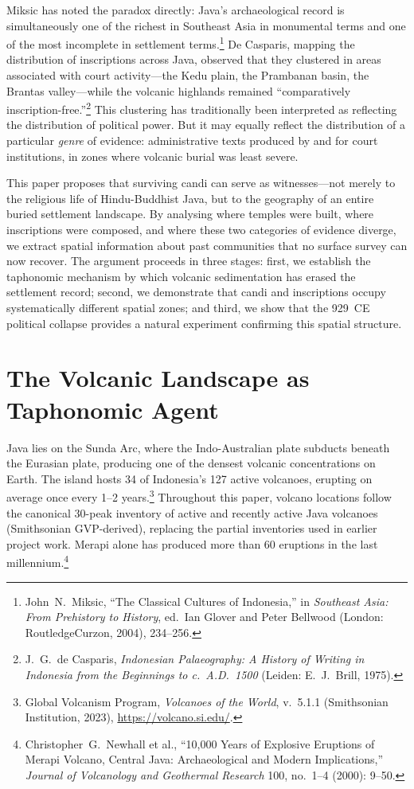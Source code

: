 \documentclass[12pt,a4paper]{article}
\begin{document}
Miksic has noted the paradox directly: Java's archaeological record is simultaneously one of the richest in Southeast Asia in monumental terms and one of the most incomplete in settlement terms.\footnote{John~N.\ Miksic, ``The Classical Cultures of Indonesia,'' in \emph{Southeast Asia: From Prehistory to History}, ed.\ Ian Glover and Peter Bellwood (London: RoutledgeCurzon, 2004), 234--256.}
De Casparis, mapping the distribution of inscriptions across Java, observed that they clustered in areas associated with court activity---the Kedu plain, the Prambanan basin, the Brantas valley---while the volcanic highlands remained ``comparatively inscription-free.''\footnote{J.~G.\ de Casparis, \emph{Indonesian Palaeography: A History of Writing in Indonesia from the Beginnings to c.~A.D.~1500} (Leiden: E.~J.\ Brill, 1975).}
This clustering has traditionally been interpreted as reflecting the distribution of political power.
But it may equally reflect the distribution of a particular \emph{genre} of evidence: administrative texts produced by and for court institutions, in zones where volcanic burial was least severe.

This paper proposes that surviving candi can serve as witnesses---not merely to the religious life of Hindu-Buddhist Java, but to the geography of an entire buried settlement landscape.
By analysing where temples were built, where inscriptions were composed, and where these two categories of evidence diverge, we extract spatial information about past communities that no surface survey can now recover.
The argument proceeds in three stages: first, we establish the taphonomic mechanism by which volcanic sedimentation has erased the settlement record; second, we demonstrate that candi and inscriptions occupy systematically different spatial zones; and third, we show that the 929~CE political collapse provides a natural experiment confirming this spatial structure.

\section{The Volcanic Landscape as Taphonomic Agent}

Java lies on the Sunda Arc, where the Indo-Australian plate subducts beneath the Eurasian plate, producing one of the densest volcanic concentrations on Earth.
The island hosts 34 of Indonesia's 127 active volcanoes, erupting on average once every 1--2 years.\footnote{Global Volcanism Program, \emph{Volcanoes of the World}, v.~5.1.1 (Smithsonian Institution, 2023), \url{https://volcano.si.edu/}.} Throughout this paper, volcano locations follow the canonical 30-peak inventory of active and recently active Java volcanoes (Smithsonian GVP-derived), replacing the partial inventories used in earlier project work.
Merapi alone has produced more than 60 eruptions in the last millennium.\footnote{Christopher~G.\ Newhall et al., ``10,000 Years of Explosive Eruptions of Merapi Volcano, Central Java: Archaeological and Modern Implications,'' \emph{Journal of Volcanology and Geothermal Research} 100, no.~1--4 (2000): 9--50.}
\end{document}
